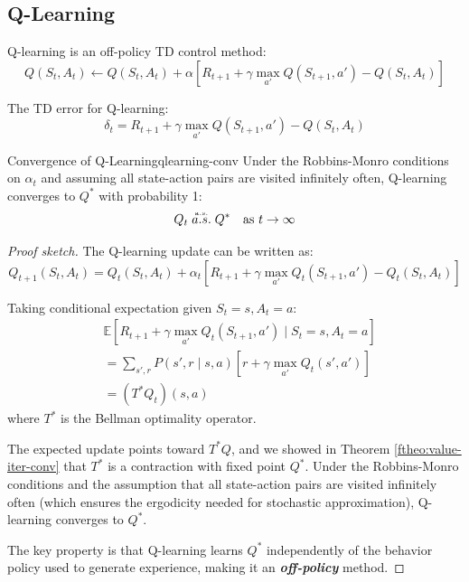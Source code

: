 \documentclass[a4paper, 11pt]{article}
\numberwithin{equation}{section}
\theoremstyle{plain}
\theoremstyle{definition}
\newcommand{\E}{{\mathbb E}}
\newcommand{\1}{{\mathbbm 1}}
\newcommand{\bi}[1]{\textbf{\textit{#1}}}
\begin{document}
	\subsection{Q-Learning}
	
	Q-learning is an off-policy TD control method:
	\begin{equation}\label{qlearning-update}
		Q(S_t, A_t) \leftarrow Q(S_t, A_t) + \alpha \left[R_{t+1} + \gamma \max_{a'} Q(S_{t+1}, a') - Q(S_t, A_t)\right]
	\end{equation}
	
	The TD error for Q-learning:
	\begin{equation}
		\delta_t = R_{t+1} + \gamma \max_{a'} Q(S_{t+1}, a') - Q(S_t, A_t)
	\end{equation}
	
	\begin{ftheo}{Convergence of Q-Learning}{qlearning-conv}
		Under the Robbins-Monro conditions on $\alpha_t$ and assuming all state-action pairs are visited infinitely often, Q-learning converges to $Q^*$ with probability 1:
		\begin{equation}
			Q_t \tos[a.s.] Q^* \quad \text{as } t \to \infty
		\end{equation}
	\end{ftheo}
	
	\begin{proof}[Proof sketch]
		The Q-learning update can be written as:
		\begin{equation*}
			Q_{t+1}(S_t, A_t) = Q_t(S_t, A_t) + \alpha_t [R_{t+1} + \gamma \max_{a'} Q_t(S_{t+1}, a') - Q_t(S_t, A_t)]
		\end{equation*}
		
		Taking conditional expectation given $S_t = s, A_t = a$:
		\begin{equation*}
			\begin{split}
				&\E[R_{t+1} + \gamma \max_{a'} Q_t(S_{t+1}, a')\;|\; S_t = s, A_t = a]\\
				&= \sum_{s', r} P(s', r\;|\; s, a) [r + \gamma \max_{a'} Q_t(s', a')]\\
				&= (T^* Q_t)(s, a)
			\end{split}
		\end{equation*}
		where $T^*$ is the Bellman optimality operator.
		
		The expected update points toward $T^* Q$, and we showed in Theorem \ref{ftheo:value-iter-conv} that $T^*$ is a contraction with fixed point $Q^*$. Under the Robbins-Monro conditions and the assumption that all state-action pairs are visited infinitely often (which ensures the ergodicity needed for stochastic approximation), Q-learning converges to $Q^*$.
		
		The key property is that Q-learning learns $Q^*$ independently of the behavior policy used to generate experience, making it an \bi{off-policy} method.
	\end{proof}
	
\end{document}
